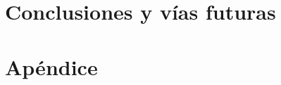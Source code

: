 \documentclass[ twoside,openright,titlepage,numbers=noenddot,headinclude,%
                footinclude=true,cleardoublepage=empty,abstractoff, %
                BCOR=5mm,paper=a4,fontsize=11pt,%
                ngerman,american,%
                ]{scrreprt}
\begin{document}
\part{Conclusiones y vías futuras}

\appendix
\cleardoublepage
\part{Apéndice}
%
\cleardoublepage
\cleardoublepage
\cleardoublepage
\end{document}
